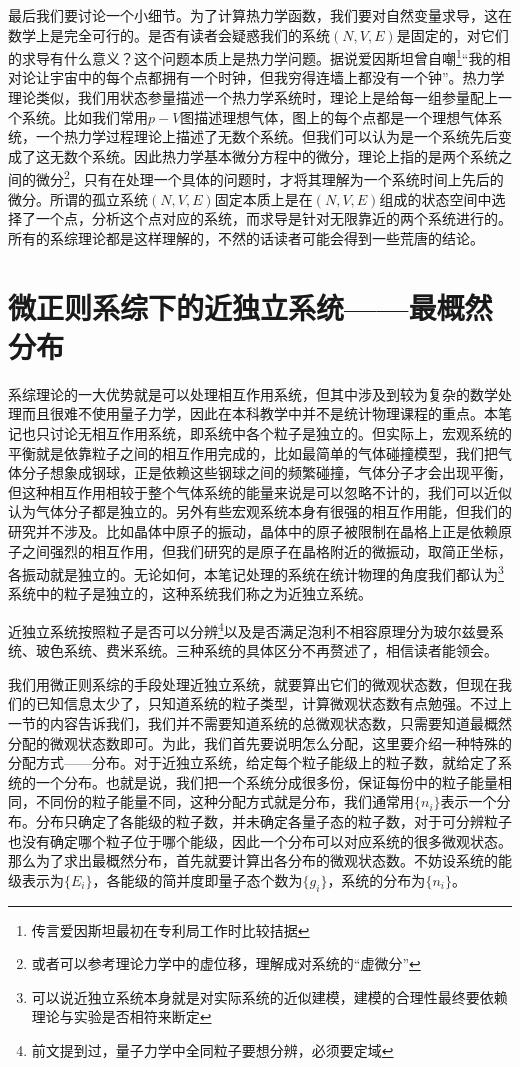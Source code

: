 \documentclass[../../main.tex]{subfiles}
\begin{document}
最后我们要讨论一个小细节。为了计算热力学函数，我们要对自然变量求导，这在数学上是完全可行的。是否有读者会疑惑我们的系统\((N,V,E)\)是固定的，对它们的求导有什么意义？这个问题本质上是热力学问题。据说爱因斯坦曾自嘲\footnote{传言爱因斯坦最初在专利局工作时比较拮据}“我的相对论让宇宙中的每个点都拥有一个时钟，但我穷得连墙上都没有一个钟”。热力学理论类似，我们用状态参量描述一个热力学系统时，理论上是给每一组参量配上一个系统。比如我们常用\(p-V\)图描述理想气体，图上的每个点都是一个理想气体系统，一个热力学过程理论上描述了无数个系统。但我们可以认为是一个系统先后变成了这无数个系统。因此热力学基本微分方程中的微分，理论上指的是两个系统之间的微分\footnote{或者可以参考理论力学中的虚位移，理解成对系统的“虚微分”}，只有在处理一个具体的问题时，才将其理解为一个系统时间上先后的微分。所谓的孤立系统\((N,V,E)\)固定本质上是在\((N,V,E)\)组成的状态空间中选择了一个点，分析这个点对应的系统，而求导是针对无限靠近的两个系统进行的。所有的系综理论都是这样理解的，不然的话读者可能会得到一些荒唐的结论。

\section{微正则系综下的近独立系统——最概然分布}\label{sec:最概然分布}

系综理论的一大优势就是可以处理相互作用系统，但其中涉及到较为复杂的数学处理而且很难不使用量子力学，因此在本科教学中并不是统计物理课程的重点。本笔记也只讨论无相互作用系统，即系统中各个粒子是独立的。但实际上，宏观系统的平衡就是依靠粒子之间的相互作用完成的，比如最简单的气体碰撞模型，我们把气体分子想象成钢球，正是依赖这些钢球之间的频繁碰撞，气体分子才会出现平衡，但这种相互作用相较于整个气体系统的能量来说是可以忽略不计的，我们可以近似认为气体分子都是独立的。另外有些宏观系统本身有很强的相互作用能，但我们的研究并不涉及。比如晶体中原子的振动，晶体中的原子被限制在晶格上正是依赖原子之间强烈的相互作用，但我们研究的是原子在晶格附近的微振动，取简正坐标，各振动就是独立的。无论如何，本笔记处理的系统在统计物理的角度我们都认为\footnote{可以说近独立系统本身就是对实际系统的近似建模，建模的合理性最终要依赖理论与实验是否相符来断定}系统中的粒子是独立的，这种系统我们称之为近独立系统。

近独立系统按照粒子是否可以分辨\footnote{前文提到过，量子力学中全同粒子要想分辨，必须要定域}以及是否满足泡利不相容原理分为玻尔兹曼系统、玻色系统、费米系统。三种系统的具体区分不再赘述了，相信读者能领会。

我们用微正则系综的手段处理近独立系统，就要算出它们的微观状态数，但现在我们的已知信息太少了，只知道系统的粒子类型，计算微观状态数有点勉强。不过上一节的内容告诉我们，我们并不需要知道系统的总微观状态数，只需要知道最概然分配的微观状态数即可。为此，我们首先要说明怎么分配，这里要介绍一种特殊的分配方式——分布。对于近独立系统，给定每个粒子能级上的粒子数，就给定了系统的一个分布。也就是说，我们把一个系统分成很多份，保证每份中的粒子能量相同，不同份的粒子能量不同，这种分配方式就是分布，我们通常用\(\{n_i\}\)表示一个分布。分布只确定了各能级的粒子数，并未确定各量子态的粒子数，对于可分辨粒子也没有确定哪个粒子位于哪个能级，因此一个分布可以对应系统的很多微观状态。那么为了求出最概然分布，首先就要计算出各分布的微观状态数。不妨设系统的能级表示为\(\{E_i\}\)，各能级的简并度即量子态个数为\(\{g_i\}\)，系统的分布为\(\{n_i\}\)。
\end{document}
